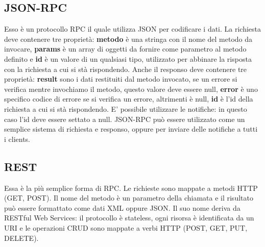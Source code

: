 \subsection{JSON-RPC}
Esso è un protocollo RPC il quale utilizza JSON per codificare i dati. La richiesta deve contenere tre proprietà: \textbf{metodo} è una stringa con il nome del metodo da invocare, \textbf{params} è un array di oggetti da fornire come parametro al metodo definito e \textbf{id} è un valore di un qualsiasi tipo, utilizzato per abbinare la risposta con la richiesta a cui si stà rispondendo. Anche il responso deve contenere tre proprietà: \textbf{result} sono i dati restituiti dal metodo invocato, se un errore si verifica mentre invochiamo il metodo, questo valore deve essere null, \textbf{error} è uno specifico codice di errore se si verifica un errore, altrimenti è null, \textbf{id} è l'id della richiesta a cui si stà rispondendo. E' possibile utilizzare le notifiche: in questo caso l'id deve essere settato a null. JSON-RPC può essere utilizzato come un semplice sistema di richiesta e responso, oppure per inviare delle notifiche a tutti i clients.
\subsection{REST}
Essa è la più semplice forma di RPC. Le richieste sono mappate a metodi HTTP (GET, POST). Il nome del metodo è un parametro della chiamata e il risultato può essere formattato come dati XML oppure JSON. Il suo nome deriva da RESTful Web Services: il protocollo è stateless, ogni risorsa è identificata da un URI e le operazioni CRUD sono mappate a verbi HTTP (POST, GET, PUT, DELETE).
